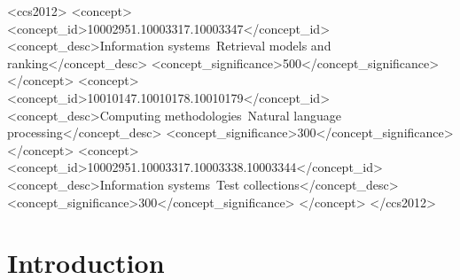\documentclass[sigconf]{acmart}
\begin{document}
\begin{abstract}
\emph{last} on 3/8; (b) replacing BM25 with off-the-shelf E5
retrieval already exceeds the paper's reported PAGC-QSG (3-component)
numbers on TREC-DL with Flan-T5-XL, and the contrastive anchor
contributes a smaller marginal gain when the candidate list is
already clean; (c) the contrastive-anchor mechanism transfers to a
4-bit AWQ-quantized 72B decoder-only model on a single 48~GB GPU,
reaching PAGC NDCG@10 $=0.7465$ on DL19, exceeding the paper's
reported Flan-UL2 (both the RG-YN+GCCP and PAGC-QSG variants); on
a 50-query BEIR check, this 72B backbone reproduces the strict
PAGC$>$GCCP$>$RG-YN ordering on SciFact and \emph{strengthens} the
DBPedia-Entity negative finding -- here PAGC underperforms not
just GCCP-alone but the E5 first-stage retriever itself, so the
negative result survives a complete change of backbone family,
scale, and precision.
\end{abstract}

\begin{CCSXML}
<ccs2012>
   <concept>
       <concept_id>10002951.10003317.10003347</concept_id>
       <concept_desc>Information systems~Retrieval models and ranking</concept_desc>
       <concept_significance>500</concept_significance>
   </concept>
   <concept>
       <concept_id>10010147.10010178.10010179</concept_id>
       <concept_desc>Computing methodologies~Natural language processing</concept_desc>
       <concept_significance>300</concept_significance>
   </concept>
   <concept>
       <concept_id>10002951.10003317.10003338.10003344</concept_id>
       <concept_desc>Information systems~Test collections</concept_desc>
       <concept_significance>300</concept_significance>
   </concept>
</ccs2012>
\end{CCSXML}



\maketitle

\section{Introduction}
\end{document}
